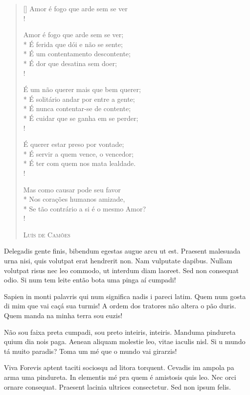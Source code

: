 \settowidth{\versewidth}{É um não querer}\label{camoes}
\begin{verse}[\versewidth]
\linenumbers
Amor é fogo que arde sem se ver\\!

Amor é fogo que arde sem se ver;\\*
É ferida que dói e não se sente;\\*
É um contentamento descontente;\\*
É dor que desatina sem doer;\\!

É um não querer mais que bem querer;\\*
É solitário andar por entre a gente;\\*
É nunca contentar-se de contente;\\*
É cuidar que se ganha em se perder;\\!

É querer estar preso por vontade;\\*
É servir a quem vence, o vencedor;\\*
É ter com quem nos mata lealdade.\\!

Mas como causar pode seu favor\\*
Nos corações humanos amizade,\\*
Se tão contrário a si é o mesmo Amor?\\!

                 \hfill    \textsc{Luís de Camões}
\end{verse}

Delegadis gente finis, bibendum egestas augue arcu ut est. Praesent malesuada
urna nisi, quis volutpat erat hendrerit non. Nam vulputate dapibus. Nullam
volutpat risus nec leo commodo, ut interdum diam laoreet. Sed non consequat
odio. Si num tem leite então bota uma pinga aí cumpadi!

Sapien in monti palavris qui num significa nadis i pareci latim.  Quem num
gosta di mim que vai caçá sua turmis! A ordem dos tratores não altera o pão
duris. Quem manda na minha terra sou euzis!

Não sou faixa preta cumpadi, sou preto inteiris, inteiris. Manduma pindureta
quium dia nois paga. Aenean aliquam molestie leo, vitae iaculis nisl. Si u
mundo tá muito paradis? Toma um mé que o mundo vai girarzis!

Viva Forevis aptent taciti sociosqu ad litora torquent. Cevadis im ampola pa
arma uma pindureta. In elementis mé pra quem é amistosis quis leo. Nec orci
ornare consequat. Praesent lacinia ultrices consectetur. Sed non ipsum felis.
%


